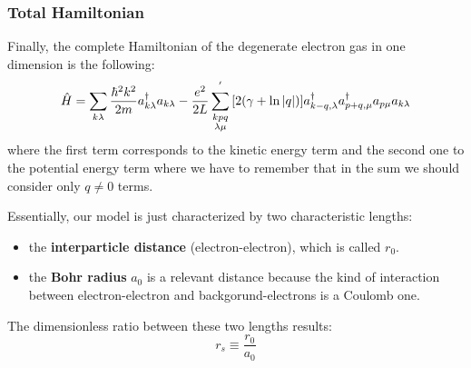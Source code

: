 \documentclass[11pt, a4paper, twoside, openright]{article}
\begin{document}
\begin{itemize}
\subsubsection*{Total Hamiltonian}
Finally, the complete Hamiltonian of the degenerate electron gas in one dimension is the following:
\begin{equation}
  \hat{H} = \sum_{k \lambda }^{} \frac{\hbar ^2 k^2}{2m} a_{k\lambda }^\dag a_{k\lambda }
  - \frac{e^2}{2L} \sum_{\substack{k p q \\ \lambda \mu  } }^{'} \qty[  2 \qty( \gamma + \ln{\abs{q } }  ) ]
  a_{k-q, \lambda } ^\dag a_{p+q,\mu }^\dag  a_{p\mu } a_{k \lambda }
\end{equation}
where the first term corresponds to the kinetic energy term and the second one to the potential energy term where we have to remember that in the sum we should consider only \( q \neq 0 \) terms.


Essentially, our model is just characterized by two characteristic lengths:
\begin{itemize}
\item the \textbf{interparticle distance} (electron-electron), which is called \( r_0 \).

\item the \textbf{Bohr radius} \( a_0 \) is a relevant distance because the kind of interaction between electron-electron and backgorund-electrons is a Coulomb one.
\end{itemize}

The dimensionless ratio between these two lengths results:
\begin{equation*}
  r_s \equiv \frac{r_0}{a_0}
\end{equation*}


\end{itemize}
\end{document}
